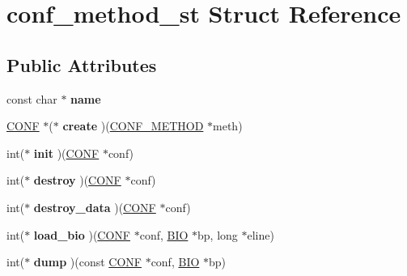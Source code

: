 \hypertarget{structconf__method__st}{}\section{conf\+\_\+method\+\_\+st Struct Reference}
\label{structconf__method__st}
\subsection*{Public Attributes}
\begin{DoxyCompactItemize}
\item 
\mbox{\label{structconf__method__st_a3349eb0f994901012106e16ffbba7a19}} 
const char $\ast$ {\bfseries name}
\item 
\mbox{\label{structconf__method__st_a11f5d812406f403c32ae2b99bb5aae5e}} 
\hyperlink{structconf__st}{C\+O\+NF} $\ast$($\ast$ {\bfseries create} )(\hyperlink{structconf__method__st}{C\+O\+N\+F\+\_\+\+M\+E\+T\+H\+OD} $\ast$meth)
\item 
\mbox{\label{structconf__method__st_af4c92d4cdeff7ceecd0b523201722c1c}} 
int($\ast$ {\bfseries init} )(\hyperlink{structconf__st}{C\+O\+NF} $\ast$conf)
\item 
\mbox{\label{structconf__method__st_a9b4f45995dd4fd551e4586aa41ed370e}} 
int($\ast$ {\bfseries destroy} )(\hyperlink{structconf__st}{C\+O\+NF} $\ast$conf)
\item 
\mbox{\label{structconf__method__st_ac68ecdd9bc4dd2cbca6379ae13fd6335}} 
int($\ast$ {\bfseries destroy\+\_\+data} )(\hyperlink{structconf__st}{C\+O\+NF} $\ast$conf)
\item 
\mbox{\label{structconf__method__st_a2a0369109a541d85263dc5ce24060a1a}} 
int($\ast$ {\bfseries load\+\_\+bio} )(\hyperlink{structconf__st}{C\+O\+NF} $\ast$conf, \hyperlink{structbio__st}{B\+IO} $\ast$bp, long $\ast$eline)
\item 
\mbox{\label{structconf__method__st_a20d82ae26d815bfc82ac54720d867cb9}} 
int($\ast$ {\bfseries dump} )(const \hyperlink{structconf__st}{C\+O\+NF} $\ast$conf, \hyperlink{structbio__st}{B\+IO} $\ast$bp)

\end{DoxyCompactItemize}
